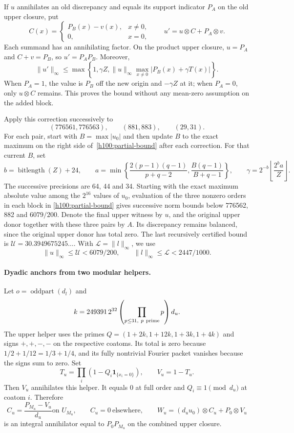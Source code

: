 \documentclass[11pt]{article}
\numberwithin{equation}{section}
\theoremstyle{definition}
\theoremstyle{remark}
\newcommand{\ind}{\mathbf1}
\begin{document}
If $u$ annihilates an old discrepancy and equals its support indicator
$P_A$ on the old upper closure, put
\[
 C(x)=\begin{cases}P_B(x)-v(x),&x\ne0,\\0,&x=0,\end{cases}
 \qquad
 u'=u\otimes C+P_A\otimes v.
\]
Each summand has an annihilating factor.  On the product upper closure,
$u=P_A$ and $C+v=P_B$, so $u'=P_AP_B$.  Moreover,
\begin{equation}\label{h100:partial-bound}
 \|u'\|_\infty\le
 \max\left\{1,\gamma Z,
   \|u\|_\infty\max_{x\ne0}|P_B(x)+\gamma T(x)|\right\}.
\end{equation}
When $P_A=1$, the value is $P_B$ off the new origin and $-\gamma Z$
at it; when $P_A=0$, only $u\otimes C$ remains.  This proves the bound
without any mean-zero assumption on the added block.

Apply this correction successively to
\[
 (776561,776563),\qquad(881,883),\qquad(29,31).
\]
For each pair, start with $B=\max|u_0|$ and then update $B$ to the
exact maximum on the right side of~\eqref{h100:partial-bound} after
each correction. For that current $B$, set
\[
 b=\operatorname{bitlength}(Z)+24,\qquad
 a=\min\left\{\frac{2(p-1)(q-1)}{p+q-2},
              \frac{B(q-1)}{B+q-1}\right\},\qquad
 \gamma=2^{-b}\left\lfloor\frac{2^b a}{Z}\right\rfloor.
\]
The successive precisions are 64, 44 and 34.  Starting with the exact
maximum absolute value among the $2^{16}$ values of $u_0$, evaluation of the three
nonzero orders in each block in \eqref{h100:partial-bound} gives successive
norm bounds below 776562, 882 and $6079/200$.  Denote the final upper witness
by $u$, and the original upper donor together with these three pairs by
$A$.  Its discrepancy remains balanced, since the original upper donor
has total zero.  The last recursively certified bound is
$\mathcal U=30.3949675245\ldots$.  With $\mathcal L=\|l\|_\infty$, we use
\begin{equation}\label{h100:individual-bounds}
 \|u\|_\infty\le\mathcal U<6079/200,\qquad
 \|l\|_\infty\le\mathcal L<2447/1000.
\end{equation}

\paragraph{Dyadic anchors from two modular helpers.}
Let $o=\operatorname{oddpart}(d_l)$ and
\[
 k=249391\,2^{32}\left(\prod_{p\le31,\ p\ {\rm prime}}p\right)d_u.
\]
The upper helper uses the primes
$Q=(1+2k,1+12k,1+3k,1+4k)$ and signs $+,+,-,-$ on the respective
coatoms.  Its total is zero because
$1/2+1/12=1/3+1/4$, and its fully nontrivial Fourier packet vanishes
because the signs sum to zero.  Set
\[
 T_u=\prod_i(1-Q_i\ind_{\{x_i=0\}}),\qquad V_u=1-T_u.
\]
Then $V_u$ annihilates this helper.  It equals 0 at full order and
$Q_i\equiv1\pmod {d_u}$ at coatom $i$.  Therefore
\[
 C_u=\frac{P_{M_u}-V_u}{d_u} \text{on }U_{M_u},\qquad C_u=0
 \ \text{elsewhere},\qquad
 W_u=(d_u u_0)\otimes C_u+P_0\otimes V_u
\]
is an integral annihilator equal to $P_0P_{M_u}$ on the combined upper
closure.
\end{document}
